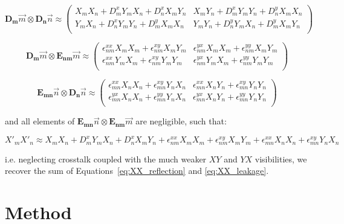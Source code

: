 \documentclass[10pt,a4paper,notitlepage]{article}
\begin{document}
\begin{equation}
\boldsymbol{D_m}\vec{m} \otimes \boldsymbol{D_n}\vec{n}
\approx
\begin{pmatrix}
X_mX_n + D^x_mY_mX_n + D^x_nX_mY_n    &    X_mY_n + D^x_mY_mY_n + D^y_nX_mX_n \\
Y_mX_n + D^x_nY_mY_n + D^y_mX_mX_n    &    Y_mY_n + D^y_nY_mX_n  + D^y_mX_mY_n \\
\end{pmatrix}
\end{equation}

\begin{equation}
\boldsymbol{D_m}\vec{m} \otimes \boldsymbol{E_{nm}}\vec{m}
\approx
\begin{pmatrix}
\epsilon^{xx}_{nm}X_mX_m + \epsilon^{xy}_{nm}X_mY_m & \epsilon^{yx}_{nm}X_mX_m + \epsilon^{yy}_{nm}X_mY_m  \\
\epsilon^{xx}_{nm}Y_mX_m + \epsilon^{xy}_{nm}Y_mY_m  & \epsilon^{yx}_{nm}Y_mX_m + \epsilon^{yy}_{nm}Y_mY_m   \\
\end{pmatrix}
\end{equation}

\begin{equation}
\boldsymbol{E_{mn}}\vec{n} \otimes \boldsymbol{D_n}\vec{n}
\approx
\begin{pmatrix}
\epsilon^{xx}_{mn}X_nX_n + \epsilon^{xy}_{mn}Y_nX_n    &    \epsilon^{xx}_{mn}X_nY_n + \epsilon^{xy}_{mn}Y_nY_n \\
\epsilon^{yx}_{mn}X_nX_n + \epsilon^{yy}_{mn}Y_nX_n    &    \epsilon^{yx}_{mn}X_nY_n + \epsilon^{yy}_{mn}Y_nY_n \\
\end{pmatrix}
\end{equation}

\noindent and all elements of $\boldsymbol{E_{mn}}\vec{n} \otimes \boldsymbol{E_{nm}}\vec{m}$ are negligible, such that:

\begin{equation}
X'_mX'_n \approx X_mX_n + D^x_mY_mX_n + D^x_nX_mY_n + \epsilon^{xx}_{nm}X_mX_m + \epsilon^{xy}_{nm}X_mY_m + \epsilon^{xx}_{mn}X_nX_n + \epsilon^{xy}_{mn}Y_nX_n 
\end{equation}

\noindent i.e. neglecting crosstalk coupled with the much weaker $XY$ and $YX$ visibilities, we recover the sum of Equations~\ref{eq:XX_reflection} and \ref{eq:XX_leakage}.

\section{Method}
\label{sec:method}
\end{document}
